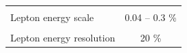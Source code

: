 \begin{table}[!htb]
\begin{center}
\begin{tabular}{|lc|}
\hline %
\vspace{-0.4cm} & \\
Lepton energy scale & 0.04 -- 0.3 \% \\ 
\vspace{-0.4cm} & \\
Lepton energy resolution & 20 \% \\ 
\hline %
\hline %
\end{tabular}
\normalsize
\end{center}
\end{table}

